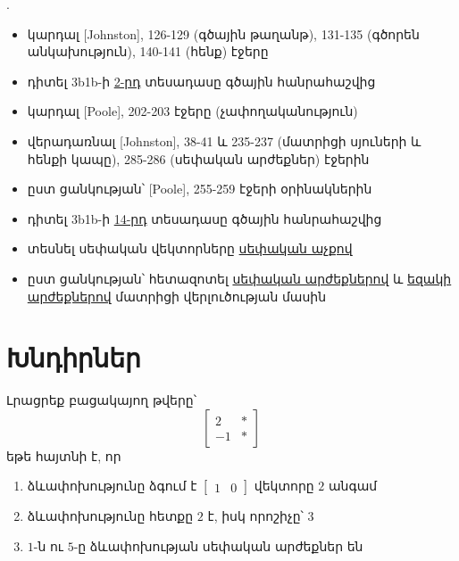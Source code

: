 \bigskip 

\begin{theory}
.
\begin{itemize}
\item կարդալ [{\rm Johnston}], 126-129 (գծային թաղանթ), 131-135 (գծորեն անկախություն), 140-141 (հենք) էջերը  
\item դիտել  {\rm 3b1b}-ի \href{https://www.3blue1brown.com/lessons/span}{2-րդ} տեսադասը գծային հանրահաշվից 
\item կարդալ [{\rm Poole}], 202-203 էջերը (չափողականություն)
\item վերադառնալ [{\rm Johnston}], 38-41 և 235-237 (մատրիցի սյունե\-րի և հենքի կապը), 285-286 (սեփական արժեքներ) էջերին
\item ըստ ցանկության՝ [{\rm Poole}], 255-259 էջերի օրինակներին
\item դիտել {\rm 3b1b}-ի \href{https://www.3blue1brown.com/lessons/eigenvalues}{14-րդ} տեսադասը գծային հանրահաշվից 
\item տեսնել սեփական վեկտորները \href{https://setosa.io/ev/eigenvectors-and-eigenvalues}{սեփական աչքով}
\item ըստ ցանկության՝ հետազոտել \href{https://www.youtu.be/mhy-ZKSARxI}{սեփական արժեքներով} և \href{https://www.ams.org/publicoutreach/feature-column/fcarc-svd}{եզակի արժեքներով} մատրիցի վերլուծության մասին
\end{itemize}
\end{theory}

\newpage

\section{Խնդիրներ}


\begin{problem}
Լրացրեք բացակայող թվերը՝
\[
\begin{bmatrix}
    2 & * \\ -1 & *
\end{bmatrix}
\]
եթե հայտնի է, որ
\begin{enumerate}[label={\alph*}․]
\item ձևափոխությունը ձգում է $\begin{bmatrix}
    1 & 0
\end{bmatrix}$ վեկտորը $2$ անգամ

\item ձևափոխությունը հետքը $2$ է, իսկ որոշիչը՝ $3$

\item $1$-ն ու $5$-ը ձևափոխության սեփական արժեքներ են
\end{enumerate}

\end{problem}

